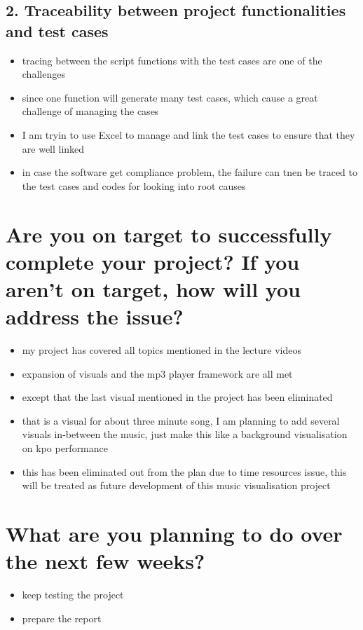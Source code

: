 \subsection*{2. Traceability between project functionalities and test cases}

\begin{itemize}
  \item tracing between the script functions with the test cases are one of the challenges
  \item since one function will generate many test cases, which cause a great challenge of managing the cases
  \item I am tryin to use Excel to manage and link the test cases to ensure that they are well linked
  \item in case the software get compliance problem, the failure can tnen be traced to the test cases and codes for looking into root causes
\end{itemize}

\section*{Are you on target to successfully complete your project? If you aren’t on target, how will you address the issue?}

\begin{itemize}
  \item my project has covered all topics mentioned in the lecture videos
  \item expansion of visuals and the mp3 player framework are all met
  \item except that the last visual mentioned in the project has been eliminated
  \item that is a visual for about three minute song, I am planning to add several visuals in-between the music, just make this like a background visualisation on kpo performance
  \item this has been eliminated out from the plan due to time resources issue, this will be treated as future development of this music visualisation project
\end{itemize}

\section*{What are you planning to do over the next few weeks?}

\begin{itemize}
  \item keep testing the project
  \item prepare the report
\end{itemize}
